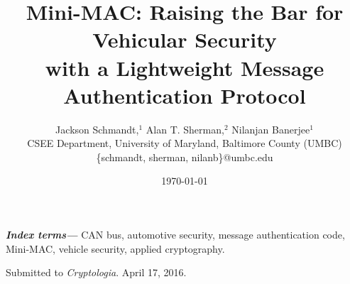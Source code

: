 \documentclass[10pt,twocolumn]{article}
\providecommand{\keywords}[1]{\textbf{\textit{Index terms---}} #1}
\begin{document}

\title{Mini-MAC: Raising the Bar for Vehicular Security\\
with a Lightweight Message Authentication Protocol}



\author{Jackson Schmandt,$^1$
Alan T. Sherman,$^2$ 
Nilanjan Banerjee$^1$\\
CSEE Department, University of Maryland, Baltimore County (UMBC)\\
\{schmandt, sherman, nilanb\}@umbc.edu\\}

\date{\today}

\maketitle




\keywords{CAN bus,
	automotive security,
	message authentication code,
	Mini-MAC,
	vehicle security,
	applied cryptography.
}
















	






\clearpage



\bigskip \noindent
Submitted to {\it Cryptologia}. {April 17, 2016}.
\end{document}
